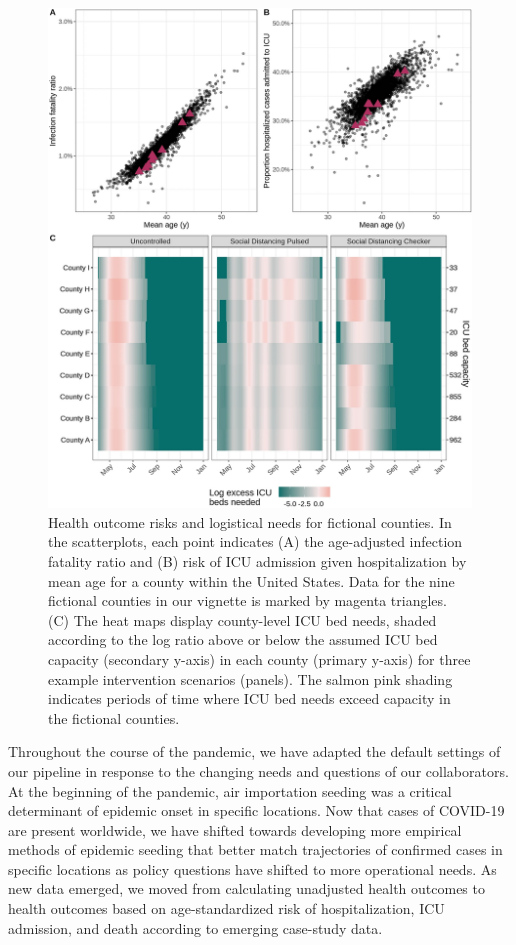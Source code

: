 \begin{figure}[!htb]%
    \centering
    \includegraphics{fig_pipeline/fig3a}
    \caption[Health outcome risks and logistical needs for fictional counties.]{Health outcome risks and logistical needs for fictional counties. In the scatterplots, each point indicates (A) the age-adjusted infection fatality ratio and (B) risk of ICU admission given hospitalization by mean age for a county within the United States. Data for the nine fictional counties in our vignette is marked by magenta triangles. (C) The heat maps display county-level ICU bed needs, shaded according to the log ratio above or below the assumed ICU bed capacity (secondary y-axis) in each county (primary y-axis) for three example intervention scenarios (panels). The salmon pink shading indicates periods of time where ICU bed needs exceed capacity in the fictional counties.}
    \label{fig:pipeline-outcome}
\end{figure}

Throughout the course of the pandemic, we have adapted the default settings of our pipeline in response to the changing needs and questions of our collaborators. At the beginning of the pandemic, air importation seeding was a critical determinant of epidemic onset in specific locations. Now that cases of COVID-19 are present worldwide, we have shifted towards developing more empirical methods of epidemic seeding that better match trajectories of confirmed cases in specific locations as policy questions have shifted to more operational needs. As new data emerged, we moved from calculating unadjusted health outcomes to health outcomes based on age-standardized risk of hospitalization, ICU admission, and death according to emerging case-study data.

